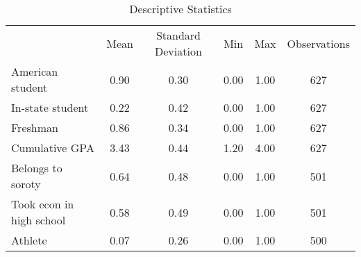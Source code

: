 \begin{table}
\caption{Descriptive Statistics}
\begin{tabular}{lccccc}
 & Mean & Standard Deviation & Min & Max & Observations \\
American student & 0.90 & 0.30 & 0.00 & 1.00 & 627 \\
In-state student & 0.22 & 0.42 & 0.00 & 1.00 & 627 \\
Freshman & 0.86 & 0.34 & 0.00 & 1.00 & 627 \\
Cumulative GPA & 3.43 & 0.44 & 1.20 & 4.00 & 627 \\
 Belongs to soroty & 0.64 & 0.48 & 0.00 & 1.00 & 501 \\
Took econ in high school & 0.58 & 0.49 & 0.00 & 1.00 & 501 \\
Athlete & 0.07 & 0.26 & 0.00 & 1.00 & 500 \\
\end{tabular}
\end{table}

